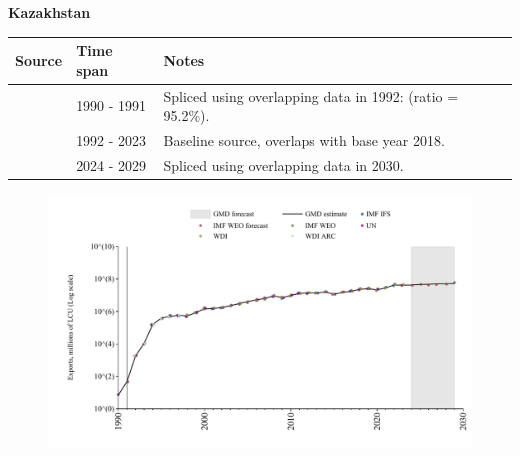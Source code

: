 \documentclass[12pt,a4paper,landscape]{article}
\begin{document}
\begin{adjustbox}{max totalsize={\paperwidth}{\paperheight},center}
\begin{minipage}[t][\textheight][t]{\textwidth}
\vspace*{0.5cm}
{}
\begin{center}
{\Large\bfseries Kazakhstan}
\end{center}
\vspace{0.5cm}
\begin{table}[H]
\centering
\small
\begin{tabular}{|l|l|l|}
\hline
\textbf{Source} & \textbf{Time span} & \textbf{Notes} \\
\hline
\rowcolor{white}\cite{UN}& 1990 - 1991 &Spliced using overlapping data in 1992: (ratio = 95.2\%).\\
\rowcolor{lightgray}\cite{WDI}& 1992 - 2023 &Baseline source, overlaps with base year 2018.\\
\rowcolor{white}\cite{IMF_WEO_forecast}& 2024 - 2029 &Spliced using overlapping data in 2030.\\
\hline
\end{tabular}
\end{table}
\begin{figure}[H]
\centering
\includegraphics[width=\textwidth,height=0.6\textheight,keepaspectratio]{graphs/KAZ_exports.pdf}
\end{figure}
\end{minipage}
\end{adjustbox}
\end{document}
